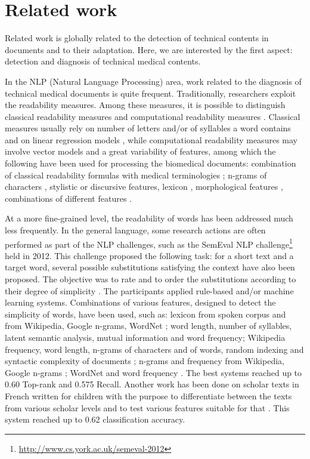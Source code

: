 \chapter{Related work}
\label{ch:related-work}
Related work is globally related to the detection of technical contents in documents and to their adaptation. Here, we are interested by the first aspect: detection and diagnosis of technical medical contents. 

In the NLP (Natural Language Processing) area, work related to the diagnosis of technical medical documents is quite frequent. Traditionally, researchers exploit the readability measures. Among these measures, it is possible to distinguish classical readability measures and computational readability measures \citep{Francois-TAL2013}. Classical measures usually rely on number of letters and/or of syllables a word contains and on linear regression models \citep{Flesch1948,Gunning1973}, while computational readability
measures may involve vector models and a great variability of
features, among which the following have been used for processing the
biomedical documents: combination of classical readability formulas
with medical terminologies \citep{Kokkinakis-2006}; n-grams of
characters \citep{Poprat-MIE2006}, stylistic \citep{Grabar-AMIA2007} or
discursive \citep{Goeuriot-LREC2008} features, lexicon
\citep{Miller-HICSS2007}, morphological features
\citep{Chmielik-TAL2011}, combinations of different features
\citep{Zeng-MEDINFO2007}.

At a more fine-grained level, the readability of words has been
addressed much less frequently. In the general language, some research
actions are often performed as part of the NLP challenges, such as the
SemEval NLP
challenge\footnote{\url{http://www.cs.york.ac.uk/semeval-2012}} held
in 2012. This challenge proposed the following task: for a short text
and a target word, several possible substitutions satisfying the
context have also been proposed. The objective was to rate and to
order the substitutions according to their degree of simplicity
\citep{specia-SEMEVAL2012}. The participants applied rule-based and/or
machine learning systems. Combinations of various features, designed
to detect the simplicity of words, have been used, such as: lexicon
from spoken corpus and from Wikipedia, Google n-grams, WordNet
\citep{sinha-SEMEVAL2012}; word length, number of syllables, latent
semantic analysis, mutual information and word
frequency\citep{jauhar-SEMEVAL2012}; Wikipedia frequency, word length,
n-grams of characters and of words, random indexing and syntactic
complexity of documents \citep{johannsen-SEMEVAL2012}; n-grams and
frequency from Wikipedia, Google n-grams \citep{ligozat-SEMEVAL2012};
WordNet and word frequency \citep{amoia-SEMEVAL2012}. The best systems
reached up to 0.60 Top-rank and 0.575 Recall.
Another work has been done on scholar texts in French written for
children with the purpose to differentiate between the texts from
various scholar levels and to test various features suitable for that
\citep{Gala-ELEX2013}. This system reached up to 0.62 classification
accuracy.

